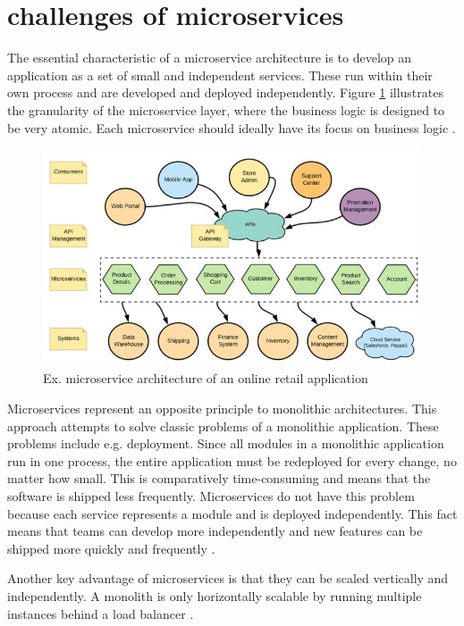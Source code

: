 \section{challenges of microservices}

The essential characteristic of a microservice architecture is to develop an application as a set of small and independent services. These run within their own process and are developed and deployed independently. Figure \ref{fig:microservice} illustrates the granularity of the microservice layer, where the business logic is designed to be very atomic. Each microservice should ideally have its focus on business logic \cite[p. 7]{sm3}.

\begin{figure}
    \includegraphics[width=\columnwidth]{img/microservice.JPG}
    \caption{Ex. microservice architecture of an online retail application \cite[p. 7]{sm3}}
    \label{fig:microservice}
\end{figure}

Microservices represent an opposite principle to monolithic architectures. This approach attempts to solve classic problems of a monolithic application. These problems include e.g. deployment. Since all modules in a monolithic application run in one process, the entire application must be redeployed for every change, no matter how small. This is comparatively time-consuming and means that the software is shipped less frequently. Microservices do not have this problem because each service represents a module and is deployed independently. This fact means that teams can develop more independently and new features can be shipped more quickly and frequently \cite{fowler}.

Another key advantage of microservices is that they can be scaled vertically and independently. A monolith is only horizontally scalable by running multiple instances behind a load balancer \cite{fowler}.

